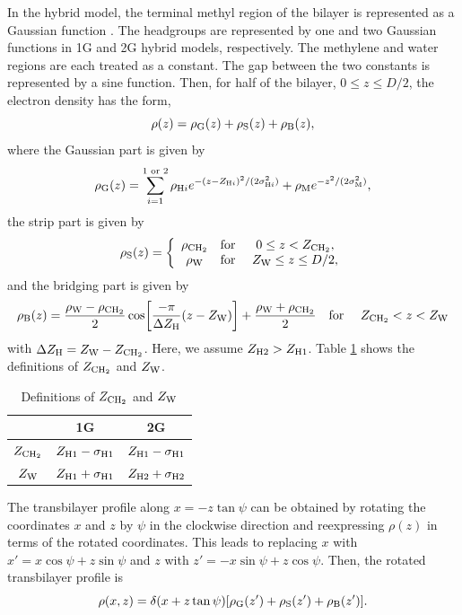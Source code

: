 In the hybrid model, the terminal methyl region of the bilayer is represented
as a Gaussian function \cite{ref:Wiener89}. The headgroups are represented by one 
and two Gaussian
functions in 1G and 2G hybrid models, respectively. The methylene and water 
regions are each treated as a constant. The gap between the two constants is 
represented by a sine function. Then, for half of the bilayer, 
$0 \leq z \leq D/2$, the electron density has the form, 
\begin{equation}
  \rho(z) = \rho_\mathrm{G}(z) + \rho_\mathrm{S}(z) + \rho_\mathrm{B}(z),
\end{equation}
where the Gaussian part is given by 
\begin{equation}
  \rho_\mathrm{G}(z) = \sum_{i=1}^{1\text{ or }2} \rho_{\mathrm{H}i}
             e^{-(z-Z_{\mathrm{H}i})^2/(2\sigma_{\mathrm{H}i}^2)} + \rho_\mathrm{M} e^{-z^2/(2\sigma_\mathrm{M}^2)},
\end{equation}
the strip part is given by
\begin{equation}
  \rho_\mathrm{S}(z) = \left\{
    \begin{array}{ccc}
      \rho_\mathrm{CH_2} & \text{for } & 0 \leq z < Z_\mathrm{CH_2}, \\
      \rho_\mathrm{W}   & \text{for } & Z_\mathrm{W} \leq z \leq D/2,
    \end{array}
  \right.
\end{equation}
and the bridging part is given by
\begin{equation}
  \rho_\mathrm{B}(z) = \frac{\rho_\mathrm{W}-\rho_\mathrm{CH_2}}{2} \cos \mathopen{}\left[ 
    \frac{-\pi}{\Delta Z_\mathrm{H}}(z-Z_\mathrm{W}) \right]\mathclose{} + \frac{\rho_\mathrm{W}+\rho_\mathrm{CH_2}}{2} \\
  \text{\quad for \quad} Z_\mathrm{CH_2} < z < Z_\mathrm{W}
\end{equation}
with $\Delta Z_\mathrm{H}=Z_\mathrm{W}-Z_\mathrm{CH_2}$. Here, we assume $Z_{\mathrm{H}2}>Z_{\mathrm{H}1}$. 
Table \ref{tab:zchtwozw} shows the definitions of $Z_\mathrm{CH_2}$ and $Z_\mathrm{W}$.

\begin{table}[htbp]
  \centering
  \begin{tabular}{c c c}
    \hline
     & 1G & 2G \\
    \hline
    $Z_\mathrm{CH_2}$ & $Z_{\mathrm{H}1}-\sigma_{\mathrm{H}1}$ & $Z_{\mathrm{H}1}-\sigma_{\mathrm{H}1}$ \\
    $Z_\mathrm{W}$ & $Z_{\mathrm{H}1}+\sigma_{\mathrm{H}1}$ & $Z_{\mathrm{H}2}+\sigma_{\mathrm{H}2}$ \\
    \hline  
  \end{tabular}
  \caption{Definitions of $Z_\mathrm{CH_2}$ and $Z_\mathrm{W}$}
  \label{tab:zchtwozw}
\end{table}

The transbilayer profile along $x=-z\tan\psi$ can be obtained by rotating
the coordinates $x$ and $z$ by $\psi$ in the clockwise direction and
reexpressing $\rho(z)$ in terms of the rotated coordinates. This leads
to replacing $x$ with $x'=x\cos\psi+z\sin\psi$ and
$z$ with $z'=-x\sin\psi+z\cos\psi$. Then, the rotated transbilayer profile is
\begin{equation}
  \rho(x,z) = \delta(x+z\tan\psi)\mathopen{}\left[ \rho_\mathrm{G}(z') + \rho_\mathrm{S}(z') + \rho_\mathrm{B}(z') \right]\mathclose{}.
  \label{eq:rotated_profile}
\end{equation}


